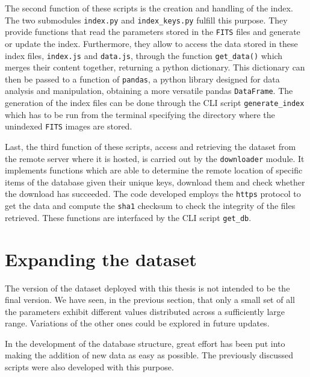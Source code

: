 \documentclass[a4paper,10pt]{report}
\begin{document}
The second function of these scripts is the creation and handling of the index.
The two submodules \lstinline{index.py} and \lstinline{index_keys.py} fulfill this purpose.
They provide functions
that read the parameters stored in the \lstinline{FITS} files and generate or update the
index. Furthermore, they allow to access the data stored in these index files,
\lstinline{index.js} and \lstinline{data.js}, 
through the function \lstinline{get_data()}
which merges their content together, returning a python dictionary.
This dictionary can then be passed to a function of \lstinline{pandas},
a python library designed for data analysis and manipulation, obtaining a more versatile pandas \lstinline{DataFrame}.
The generation of the index files can be done through the CLI script \lstinline{generate_index} which has to be run from 
the terminal specifying the directory where the unindexed \lstinline{FITS} images are stored.

Last, the third function of these scripts, access and retrieving the dataset from the remote server where
it is hosted, is carried out by the \lstinline{downloader} module.
It implements functions which are able to determine the remote location of specific items of the database 
given their unique keys, download them and check whether the download has succeeded.
The code developed employs the \lstinline{https} protocol to get the data and compute the \lstinline{sha1} 
checksum to check the integrity of the files retrieved.
These functions are interfaced by the CLI script \lstinline{get_db}.

\section{Expanding the dataset}

The version of the dataset deployed with this thesis is not intended to be the final version. 
We have seen, in the previous section, that only a small set of all the parameters exhibit different values distributed
across a sufficiently large range. Variations of the other ones could be explored in future updates.

In the development of the database structure, great effort has been put into making the addition of new
data as easy as possible. The previously discussed scripts were also developed with this purpose.
\end{document}
